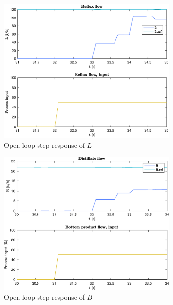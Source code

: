 \documentclass[12pt]{article}
\begin{document}
\begin{figure}[p]
\centering
\includegraphics[width=0.8\textwidth]{../Systemanalyse/Log_Data_to_Matlab/Figurer/Stegeksperimenter/FC1015.eps}
\caption{Open-loop step response of $L$}
\label{fig:ol_step_FC1015}
\end{figure}

\begin{figure}[p]
\centering
\includegraphics[width=0.8\textwidth]{../Systemanalyse/Log_Data_to_Matlab/Figurer/Stegeksperimenter/FC1019.eps}
\caption{Open-loop step response of $B$}
\label{fig:ol_step_FC1019}
\end{figure}
\end{document}
